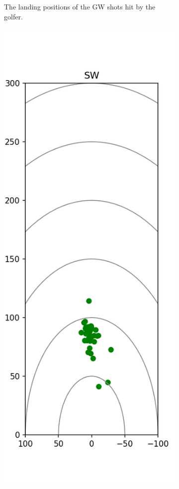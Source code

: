 \documentclass{kththesis}
\begin{document}
\begin{figure}
\begin{subfigure}{0.4\textwidth}
    \caption{The landing positions of the GW shots hit by the golfer.}
    \label{fig:GW_shots}
    \end{subfigure}
    \begin{subfigure}{0.4\textwidth}
    \centering
    \includegraphics[height=0.4\textheight]{Shots/SW_shots.png} 

\end{subfigure}
\end{figure}
\end{document}
